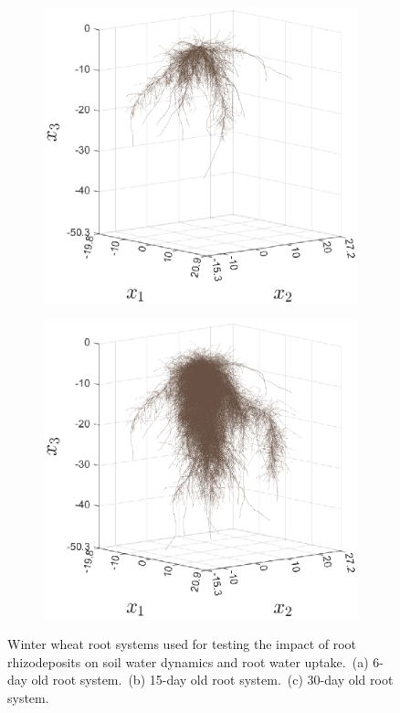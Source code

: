 \documentclass[11pt,a4paper]{article}
\numberwithin{equation}{section}
\begin{document}
\begin{figure}
\begin{subfigure}{0.275\textwidth}
		\includegraphics[width = \linewidth, keepaspectratio] {trigo15days1_3D_plot.eps}
		\caption{}
	\end{subfigure}\qquad
	\begin{subfigure}{0.275\textwidth}
		\includegraphics[width = \linewidth, keepaspectratio] {trigo30days1_3D_plot.eps}
		\caption{}
	\end{subfigure}
	\caption{Winter wheat root systems used for testing the impact of root rhizodeposits on soil water dynamics and root water uptake.~(a) 6-day old root system.~(b) 15-day old root system.~(c) 30-day old root system.}
	\label{figure: simulated root systems}
\end{figure}
\end{document}
